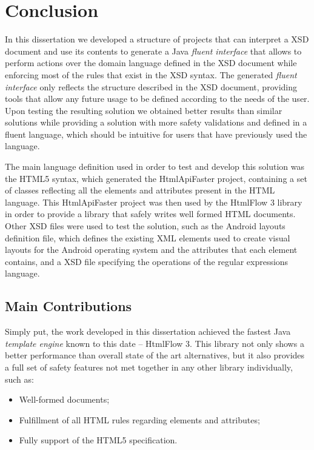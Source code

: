 \chapter{Conclusion}
\label{cha:conclusion}

In this dissertation we developed a structure of projects that can interpret a \ac{XSD} document and use its contents to generate a Java \textit{fluent interface} that allows to perform actions over the domain language defined in the \ac{XSD} document while enforcing most of the rules that exist in the \ac{XSD} syntax. The generated \textit{fluent interface} only reflects the structure described in the \ac{XSD} document, providing tools that allow any future usage to be defined according to the needs of the user. Upon testing the resulting solution we obtained better results than similar solutions while providing a solution with more safety validations and defined in a fluent language, which should be intuitive for users that have previously used the language.

\noindent
The main language definition used in order to test and develop this solution was the \ac{HTML}5 syntax, which generated the HtmlApiFaster project, containing a set of classes reflecting all the elements and attributes present in the \ac{HTML} language. This HtmlApiFaster project was then used by the HtmlFlow 3 library in order to provide a library that safely writes well formed \ac{HTML} documents. Other \ac{XSD} files were used to test the solution, such as the Android layouts definition file, which defines the existing \ac{XML} elements used to create visual layouts for the Android operating system and the attributes that each element contains, and a \ac{XSD} file specifying the operations of the regular expressions language.

\section{Main Contributions}
\label{sec:maincontributions}

Simply put, the work developed in this dissertation achieved the fastest Java \textit{template engine} known to this date – HtmlFlow 3. This library not only shows a better performance than overall state of the art alternatives, but it also provides a full set of safety features not met together in any other library individually, such as: 

\begin{itemize}
	\item Well-formed documents;
	\item Fulfillment of all \ac{HTML} rules regarding elements and attributes;
	\item Fully support of the \ac{HTML}5 specification.
\end{itemize}


